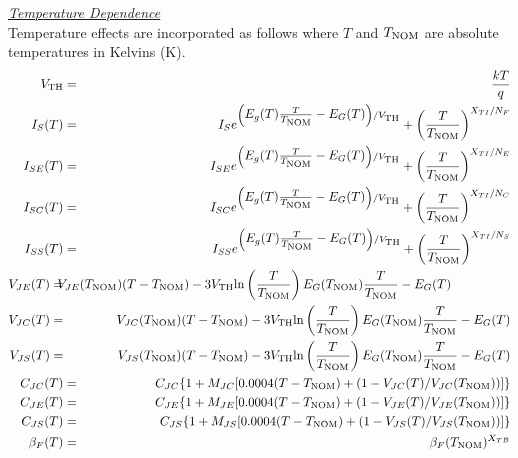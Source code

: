 \clearpage
\noindent\underline{\sl \large Temperature Dependence}
\\[0.1in]
Temperature effects are incorporated as follows where $T$ and $T_{\mbox{\scriptsize NOM}}$
are absolute temperatures in Kelvins (K).
\begin{eqnarray}
V_{\ms{TH}} & = & {{kT} \over q}\\
I_S (T) & = & I_S e^{\left( \textstyle E_g(T) {T \over {T_{\ms{NOM}}}}
      - E_G(T) \right) /V_{\ms{TH}}}+
      \left( {T \over {T_{\ms{NOM}}}} \right) ^{X_{TI}/N_F}\\
I_{SE}(T)&=&I_{SE} e^{\left( \textstyle E_g(T) {T \over {T_{\ms{NOM}}}}
      - E_G(T) \right) /V_{\ms{TH}}}+
      \left( {T \over {T_{\ms{NOM}}}} \right) ^{X_{TI}/N_E}\\
I_{SC}(T)&=&I_{SC} e^{\left( \textstyle E_g(T) {T \over {T_{\ms{NOM}}}}
      - E_G(T) \right) /V_{\ms{TH}}}+
      \left( {T \over {T_{\ms{NOM}}}} \right) ^{X_{TI}/N_C}\\
I_{SS}(T)&=&I_{SS} e^{\left( \textstyle E_g(T) {T \over {T_{\ms{NOM}}}}
      - E_G(T) \right) /V_{\ms{TH}}}+
      \left( {T \over {T_{\ms{NOM}}}} \right) ^{X_{TI}/N_S}\\
V_{JE}(T) =&&\hspace{-0.35in}
V_{JE}(T_{\ms{NOM}})(T-T_{\ms{NOM}})
        -3V_{\ms{TH}}\mbox{ln}\left( {T \over {T_{\ms{NOM}}}} \right)
      E_G(T_{\ms{NOM}}){T \over {T_{\ms{NOM}}}} -E_G(T)
      \ \ \ \ \ \ \ \ \ \ \ \ \ \  \\
V_{JC}(T)=&&\hspace{-0.35in}V_{JC}(T_{\ms{NOM}})(T-T_{\ms{NOM}})
        -3V_{\ms{TH}}\mbox{ln}\left( {T \over {T_{\ms{NOM}}}} \right)
      E_G(T_{\ms{NOM}}){T \over {T_{\ms{NOM}}}} -E_G(T) \\
V_{JS}(T)=&&\hspace{-0.35in}V_{JS}(T_{\ms{NOM}})(T-T_{\ms{NOM}})
        -3V_{\ms{TH}}\mbox{ln}\left( {T \over {T_{\ms{NOM}}}} \right)
      E_G(T_{\ms{NOM}}){T \over {T_{\ms{NOM}}}} -E_G(T) \\
C_{JC} (T) & = & C_{JC} \{1 +
     M_{JC} [0.0004(T-T_{\ms{NOM}})+(1-V_{JC}(T)/V_{JC}(T_{\ms{NOM}}))]\}\\
C_{JE} (T) & = & C_{JE} \{1 +
     M_{JE} [0.0004(T-T_{\ms{NOM}})+(1-V_{JE}(T)/V_{JE}(T_{\ms{NOM}}))]\}\\
C_{JS} (T) & = & C_{JS} \{1 +
     M_{JS} [0.0004(T-T_{\ms{NOM}})+(1-V_{JS}(T)/V_{JS}(T_{\ms{NOM}}))]\}\\
\beta_F(T)&=&\beta_F(T_{\ms{NOM}})^{X_{TB}}\\

\end{eqnarray}
